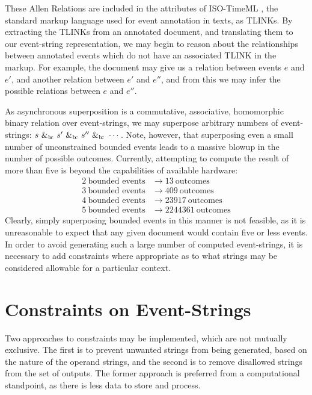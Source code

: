 \documentclass[a4paper,11pt]{article}
\newcommand{\bc}{{\rm b\!c}}
\begin{document}
These Allen Relations are included in the attributes of ISO-TimeML 
\citep{pustejovsky2010iso}, the standard 
markup language used for event annotation in texts, as TLINKs. By extracting 
the TLINKs from an annotated document, and translating them to our event-string 
representation, we may begin to reason about the relationships between 
annotated events which do not have an associated TLINK in the markup. For 
example, the document may give us a relation between events $e$ and $e'$, and 
another relation between $e'$ and $e''$, and from this we may infer the 
possible 
relations between $e$ and $e''$.

As asynchronous superposition is a commutative, associative, homomorphic binary 
relation over \iffalse{}well-formed\fi{}event-strings, we may superpose 
arbitrary numbers of event-strings: $s ~\&_{\bc}~ s' ~\&_{\bc}~ s'' ~\&_{\bc}~ 
\cdots$. Note, however, that superposing even a 
small number of unconstrained bounded events leads to a massive blowup in the 
number of possible outcomes. Currently, attempting to compute the result of 
more than five is beyond the capabilities of available hardware:
\begin{align*}
2 ~\mbox{bounded events} &\to 13 ~\mbox{outcomes}\\
3 ~\mbox{bounded events} &\to 409 ~\mbox{outcomes}\\
4 ~\mbox{bounded events} &\to 23917 ~\mbox{outcomes}\\
5 ~\mbox{bounded events} &\to 2244361 ~\mbox{outcomes}
\end{align*}
Clearly, simply superposing bounded events in this manner is not feasible, as 
it 
is unreasonable to expect that any given document would contain five or less 
events. In order to avoid generating such a large number of computed 
event-strings, it is necessary to add constraints where appropriate as to what 
strings may be considered allowable for a particular context.

\section{Constraints on Event-Strings}\label{constraints}
Two approaches to constraints may be implemented, which are not mutually 
exclusive. The first is to prevent unwanted strings from being generated, based 
on the nature of the operand strings, and the second is to remove disallowed 
strings from the set of outputs. The former approach is preferred from a 
computational standpoint, as there is less data to store and process.
\end{document}
